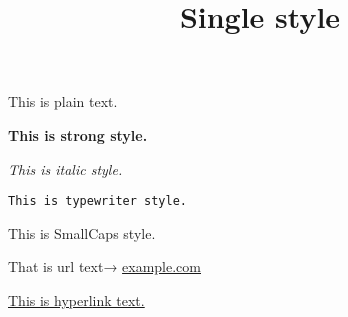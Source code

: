 \documentclass[a4paper,11pt,oneside,openany,report]{jsbook}
\title{Single style}
\begin{document}
\maketitle
This is plain text.

{\bf This is strong style.}

{\sl This is italic style.}

{\tt This is typewriter style.}

{\sc This is SmallCaps style.}

That is url text→
\url{example.com}

\href{example.com}{This is hyperlink text.}
\end{document}

